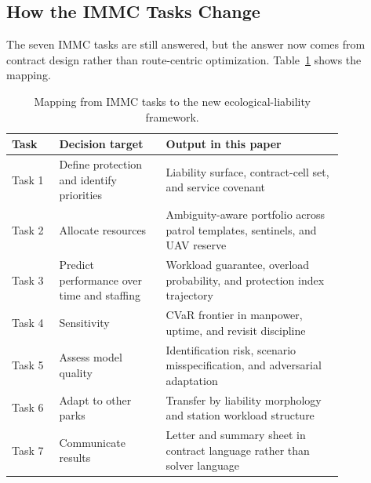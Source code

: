 \subsection{How the IMMC Tasks Change}
The seven IMMC tasks are still answered, but the answer now comes from contract design rather than route-centric optimization. Table~\ref{tab:qmap} shows the mapping.
\begin{table}[H]
  \centering
  \caption{Mapping from IMMC tasks to the new ecological-liability framework.}
  \label{tab:qmap}
  \begin{tabular}{p{0.12\linewidth}p{0.27\linewidth}p{0.45\linewidth}}
    \toprule
    Task & Decision target & Output in this paper \\
    \midrule
    Task 1 & Define protection and identify priorities & Liability surface, contract-cell set, and service covenant \\
    Task 2 & Allocate resources & Ambiguity-aware portfolio across patrol templates, sentinels, and UAV reserve \\
    Task 3 & Predict performance over time and staffing & Workload guarantee, overload probability, and protection index trajectory \\
    Task 4 & Sensitivity & CVaR frontier in manpower, uptime, and revisit discipline \\
    Task 5 & Assess model quality & Identification risk, scenario misspecification, and adversarial adaptation \\
    Task 6 & Adapt to other parks & Transfer by liability morphology and station workload structure \\
    Task 7 & Communicate results & Letter and summary sheet in contract language rather than solver language \\
    \bottomrule
  \end{tabular}
\end{table}
